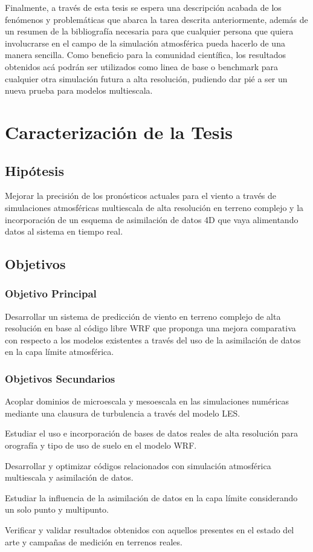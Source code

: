 Finalmente, a través de esta tesis se espera una descripción acabada de los fenómenos y problemáticas que abarca la tarea descrita anteriormente, además de un resumen de la bibliografía necesaria para que cualquier persona que quiera involucrarse en el campo de la simulación atmosférica pueda hacerlo de una manera sencilla. Como beneficio para la comunidad científica, los resultados obtenidos acá podrán ser utilizados como linea de base o benchmark para cualquier otra simulación futura a alta resolución, pudiendo dar pié a ser un nueva prueba para modelos multiescala.

\section{Caracterización de la Tesis}
\subsection{Hipótesis}

Mejorar la precisión de los pronósticos actuales para el viento a través de simulaciones atmosféricas multiescala de alta resolución en terreno complejo y la incorporación de un esquema de asimilación de datos 4D que vaya alimentando datos al sistema en tiempo real.

\subsection{Objetivos}
\subsubsection{Objetivo Principal}
\begin{itemize*}
	\item Desarrollar un sistema de predicción de viento en terreno complejo de alta resolución en base al código libre WRF que proponga una mejora comparativa con respecto a los modelos existentes a través del uso de la asimilación de datos en la capa límite atmosférica.
\end{itemize*}
\subsubsection{Objetivos Secundarios}
\begin{itemize*}
	\item Acoplar dominios de microescala y mesoescala en las simulaciones numéricas mediante una clausura de turbulencia a través del modelo LES.
	\item Estudiar el uso e incorporación de bases de datos reales de alta resolución para orografía y tipo de uso de suelo en el modelo WRF.
	\item Desarrollar y optimizar códigos relacionados con simulación atmosférica multiescala y asimilación de datos.
	\item Estudiar la influencia de la asimilación de datos en la capa límite considerando un solo punto y multipunto.
	\item Verificar y validar resultados obtenidos con aquellos presentes en el estado del arte y campañas de medición en terrenos reales.
\end{itemize*}

